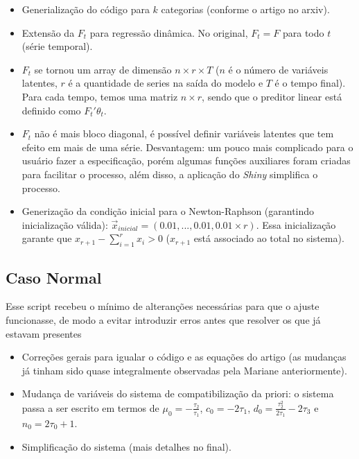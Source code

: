 \documentclass[
]{article}
\begin{document}
\begin{itemize}
  \item Generialização do código para $k$ categorias (conforme o artigo no arxiv).
  \item Extensão da $F_t$ para regressão dinâmica. No original, $F_t=F$ para todo $t$ (série temporal).
  \item $F_t$ se tornou um array de dimensão $n \times r \times T$ ($n$ é o número de variáveis latentes, $r$ é a quantidade de series na saída do modelo e $T$ é o tempo final). Para cada tempo, temos uma matriz $n \times r$, sendo que o preditor linear está definido como $F_t' \theta_t$.
  \item $F_t$ não é mais bloco diagonal, é possível definir variáveis latentes que tem efeito em mais de uma série. Desvantagem: um pouco mais complicado para o usuário fazer a especificação, porém algumas funções auxiliares foram criadas para facilitar o processo, além disso, a aplicação do \emph{Shiny} simplifica o processo.
  \item Generização da condição inicial para o Newton-Raphson (garantindo inicialização válida): $\vec{x}_{inicial}=(0.01,...,0.01,0.01 \times r)$. Essa inicialização garante que $x_{r+1}-\sum_{i=1}^{r} x_i>0$ ($x_{r+1}$ está associado ao total no sistema).
\end{itemize}

\hypertarget{caso-normal}{%
\subsection{Caso Normal}\label{caso-normal}}

Esse script recebeu o mínimo de alteranções necessárias para que o
ajuste funcionasse, de modo a evitar introduzir erros antes que resolver
os que já estavam presentes

\begin{itemize}
  \item Correções gerais para igualar o código e as equações do artigo (as mudanças já tinham sido quase integralmente observadas pela Mariane anteriormente).
  \item Mudança de variáveis do sistema de compatibilização da priori: o sistema passa a ser escrito em termos de $\mu_0=-\frac{\tau_2}{\tau_1}$, $c_0=-2\tau_1$, $d_0=\frac{\tau_2^2}{2\tau_1}-2\tau_3$ e $n_0=2\tau_0+1$.
  \item Simplificação do sistema (mais detalhes no final).
\end{itemize}
\end{document}
